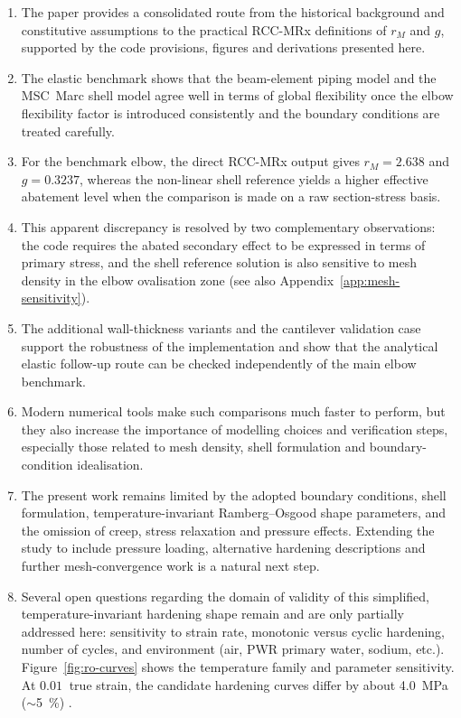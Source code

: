 \documentclass[10pt,a4paper]{article}
\begin{document}
\begin{enumerate}
\item The paper provides a consolidated route from the historical background and constitutive assumptions to the practical RCC-MRx definitions of $r_M$ and $g$, supported by the code provisions, figures and derivations presented here.
\item The elastic benchmark shows that the beam-element piping model and the MSC~Marc shell model agree well in terms of global flexibility once the elbow flexibility factor is introduced consistently and the boundary conditions are treated carefully.
\item For the benchmark elbow, the direct RCC-MRx output gives $r_M=2.638$ and $g=0.3237$, whereas the non-linear shell reference yields a higher effective abatement level when the comparison is made on a raw section-stress basis.
\item This apparent discrepancy is resolved by two complementary observations: the code requires the abated secondary effect to be expressed in terms of primary stress, and the shell reference solution is also sensitive to mesh density in the elbow ovalisation zone (see also Appendix~\ref{app:mesh-sensitivity}).
\item The additional wall-thickness variants and the cantilever validation case support the robustness of the implementation and show that the analytical elastic follow-up route can be checked independently of the main elbow benchmark.
\item Modern numerical tools make such comparisons much faster to perform, but they also increase the importance of modelling choices and verification steps, especially those related to mesh density, shell formulation and boundary-condition idealisation.
\item The present work remains limited by the adopted boundary conditions, shell formulation, temperature-invariant Ramberg--Osgood shape parameters, and the omission of creep, stress relaxation and pressure effects. Extending the study to include pressure loading, alternative hardening descriptions and further mesh-convergence work is a natural next step.



\item Several open questions regarding the domain of validity of this simplified, temperature-invariant hardening shape remain and are only partially addressed here: sensitivity to strain rate, monotonic versus cyclic hardening, number of cycles, and environment (air, PWR primary water, sodium, etc.). Figure~\ref{fig:ro-curves} shows the temperature family and parameter sensitivity. At $\SI{0.01}{}$ true strain, the candidate hardening curves differ by about \SI{4.0}{MPa} ($\sim$\SI{5}{\percent}) \cite{NASAn1930}.


\end{enumerate}
\end{document}
